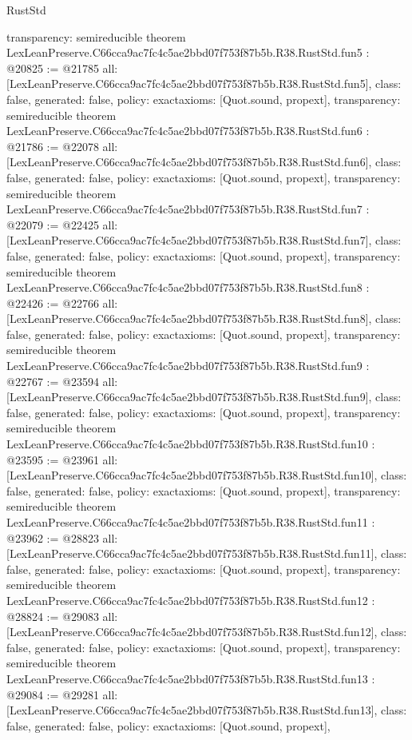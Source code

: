 \begin{lexlean}{RustStd}
\begin{coremodule}
{  transparency: semireducible
}
theorem LexLeanPreserve.C66cca9ac7fc4c5ae2bbd07f753f87b5b.R38.RustStd.fun5 : @20825 := @21785 {
  all: [LexLeanPreserve.C66cca9ac7fc4c5ae2bbd07f753f87b5b.R38.RustStd.fun5],
  class: false,
  generated: false,
  policy: exact{axioms: [Quot.sound, propext]},
  transparency: semireducible
}
theorem LexLeanPreserve.C66cca9ac7fc4c5ae2bbd07f753f87b5b.R38.RustStd.fun6 : @21786 := @22078 {
  all: [LexLeanPreserve.C66cca9ac7fc4c5ae2bbd07f753f87b5b.R38.RustStd.fun6],
  class: false,
  generated: false,
  policy: exact{axioms: [Quot.sound, propext]},
  transparency: semireducible
}
theorem LexLeanPreserve.C66cca9ac7fc4c5ae2bbd07f753f87b5b.R38.RustStd.fun7 : @22079 := @22425 {
  all: [LexLeanPreserve.C66cca9ac7fc4c5ae2bbd07f753f87b5b.R38.RustStd.fun7],
  class: false,
  generated: false,
  policy: exact{axioms: [Quot.sound, propext]},
  transparency: semireducible
}
theorem LexLeanPreserve.C66cca9ac7fc4c5ae2bbd07f753f87b5b.R38.RustStd.fun8 : @22426 := @22766 {
  all: [LexLeanPreserve.C66cca9ac7fc4c5ae2bbd07f753f87b5b.R38.RustStd.fun8],
  class: false,
  generated: false,
  policy: exact{axioms: [Quot.sound, propext]},
  transparency: semireducible
}
theorem LexLeanPreserve.C66cca9ac7fc4c5ae2bbd07f753f87b5b.R38.RustStd.fun9 : @22767 := @23594 {
  all: [LexLeanPreserve.C66cca9ac7fc4c5ae2bbd07f753f87b5b.R38.RustStd.fun9],
  class: false,
  generated: false,
  policy: exact{axioms: [Quot.sound, propext]},
  transparency: semireducible
}
theorem LexLeanPreserve.C66cca9ac7fc4c5ae2bbd07f753f87b5b.R38.RustStd.fun10 : @23595 := @23961 {
  all: [LexLeanPreserve.C66cca9ac7fc4c5ae2bbd07f753f87b5b.R38.RustStd.fun10],
  class: false,
  generated: false,
  policy: exact{axioms: [Quot.sound, propext]},
  transparency: semireducible
}
theorem LexLeanPreserve.C66cca9ac7fc4c5ae2bbd07f753f87b5b.R38.RustStd.fun11 : @23962 := @28823 {
  all: [LexLeanPreserve.C66cca9ac7fc4c5ae2bbd07f753f87b5b.R38.RustStd.fun11],
  class: false,
  generated: false,
  policy: exact{axioms: [Quot.sound, propext]},
  transparency: semireducible
}
theorem LexLeanPreserve.C66cca9ac7fc4c5ae2bbd07f753f87b5b.R38.RustStd.fun12 : @28824 := @29083 {
  all: [LexLeanPreserve.C66cca9ac7fc4c5ae2bbd07f753f87b5b.R38.RustStd.fun12],
  class: false,
  generated: false,
  policy: exact{axioms: [Quot.sound, propext]},
  transparency: semireducible
}
theorem LexLeanPreserve.C66cca9ac7fc4c5ae2bbd07f753f87b5b.R38.RustStd.fun13 : @29084 := @29281 {
  all: [LexLeanPreserve.C66cca9ac7fc4c5ae2bbd07f753f87b5b.R38.RustStd.fun13],
  class: false,
  generated: false,
  policy: exact{axioms: [Quot.sound, propext]},
}
\end{coremodule}
\end{lexlean}
